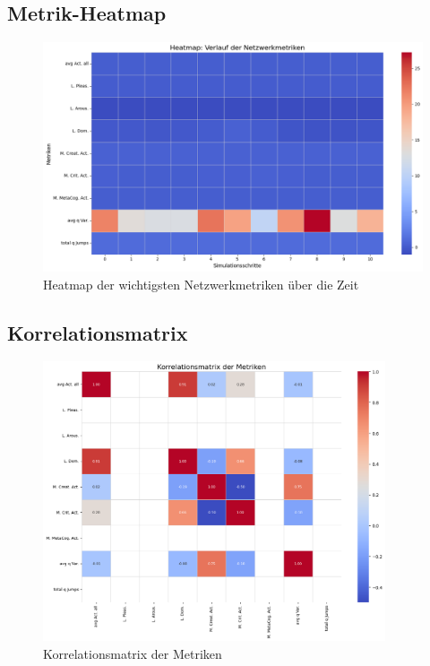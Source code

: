 \documentclass[11pt,a4paper]{article}
\begin{document}
\subsection{Metrik-Heatmap}

\begin{figure}[H]
    \centering
    \includegraphics[width=\textwidth]{metrics_heatmap.png}
    \caption{Heatmap der wichtigsten Netzwerkmetriken über die Zeit}
    \label{fig:metrics_heatmap}
\end{figure}

\subsection{Korrelationsmatrix}

\begin{figure}[H]
    \centering
    \includegraphics[width=0.9\textwidth]{correlation_heatmap.png}
    \caption{Korrelationsmatrix der Metriken}
    \label{fig:correlation_heatmap}
\end{figure}
\end{document}
